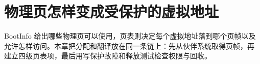 \chapter{物理页怎样变成受保护的虚拟地址}

BootInfo 给出哪些物理页可以使用，页表则决定每个虚拟地址落到哪个页帧以及
允许怎样访问。本章把分配和翻译放在同一条链上：先从伙伴系统取得页帧，再
建立四级页表项，最后用写保护故障和释放测试检查权限与回收。






